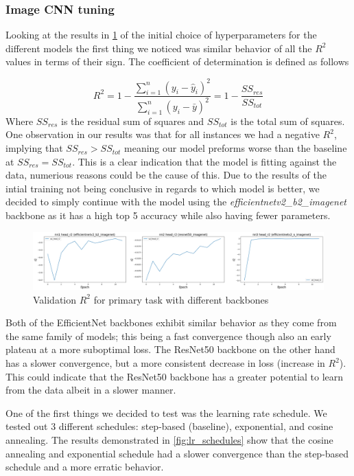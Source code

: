 \documentclass[12pt,a4paper,oneside]{article}
\begin{document}
\subsubsection{Image CNN tuning}

Looking at the results in \ref{fig:different_backbones} of the initial choice of hyperparameters for the different models the first thing we noticed was similar behavior of all the $R^2$ values in terms of their sign. The coefficient of determination is defined as follows 

\[
    R^2 = 1 - \frac{\sum_{i=1}^{n} (y_i - \hat{y}_i)^2}{\sum_{i=1}^{n} (y_i - \bar{y})^2} = 1 - \frac{SS_{res}}{SS_{tot}}  
\]
Where $SS_{res}$ is the residual sum of squares and $SS_{tot}$ is the total sum of squares. One observation in our results was that for all instances we had a negative $R^2$, implying that $SS_{res} > SS_{tot}$ meaning our model preforms worse than the baseline at $SS_{res} = SS_{tot}$. This is a clear indication that the model is fitting against the data, numerious reasons could be the cause of this. Due to the results of the intial training not being conclusive in regards to which model is better, we decided to simply continue with the model using the \textit{efficientnetv2\_b2\_imagenet} backbone as it has a high top 5 accuracy while also having fewer parameters.

\begin{figure}[!h]
    \centering
    \includegraphics[width=1\textwidth]{assets/different_backbones.png}
    \caption{Validation $R^2$ for primary task with different backbones}
    \label{fig:different_backbones}
\end{figure}

Both of the EfficientNet backbones exhibit similar behavior as they come from the same family of models; this being a fast convergence though also an early plateau at a more suboptimal loss. The ResNet50 backbone on the other hand has a slower convergence, but a more consistent decrease in loss (increase in $R^2$). This could indicate that the ResNet50 backbone has a greater potential to learn from the data albeit in a slower manner. 

\smallskip 
One of the first things we decided to test was the learning rate schedule. We tested out 3 different schedules: step-based (baseline), exponential, and cosine annealing. The results demonstrated in \ref{fig:lr_schedules} show that the cosine annealing and exponential schedule had a slower convergence than the step-based schedule and a more erratic behavior.  
\end{document}
